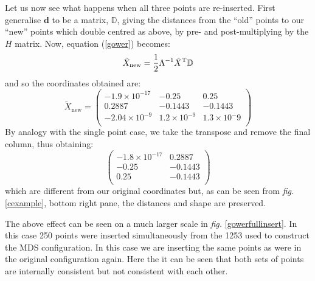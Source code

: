 \documentclass[a4paper,10pt]{article}
\newcommand{\fig}[1]{\emph{fig.} \ref{#1}}
\newcommand{\tr}[1]{#1^{\text{T}}}
\newcommand{\cross}{\times}
\begin{document}
Let us now see what happens when all three points are re-inserted. First generalise $\mathbf{d}$ to be a matrix, $\mathbb{D}$, giving the distances from the ``old'' points to our ``new'' points which double centred as above, by pre- and post-multiplying by the $H$ matrix. Now, equation (\ref{gower}) becomes:
\begin{equation*}
\tilde{X}_{\text{new}} = \frac{1}{2} \Lambda^{-1} \tr{\tilde{X}} \mathbb{D}\\
\end{equation*}
and so the coordinates obtained are:
\begin{equation*}
\tilde{X}_\text{new}=\begin{pmatrix}
-1.9\cross 10^{-17} & -0.25 & 0.25\\
 0.2887 & -0.1443 & -0.1443\\
-2.04\cross 10^{-9} &  1.2\cross 10^{-9} & 1.3\cross 10^-{9}\\
\end{pmatrix}
\end{equation*}
By analogy with the single point case, we take the transpose and remove the final column, thus obtaining:
\begin{equation*}
\begin{pmatrix}
-1.8\cross 10^{-17} &  0.2887\\
-0.25 & -0.1443\\
 0.25 & -0.1443\\
\end{pmatrix}
\end{equation*}
which are different from our original coordinates but, as can be seen from \fig{cexample}, bottom right pane, the distances and shape are preserved.

The above effect can be seen on a much larger scale in \fig{gowerfullinsert}. In this case 250 points were inserted simultaneously from the 1253 used to construct the MDS configuration. In this case we are inserting the same points as were in the original configuration again. Here the it can be seen that both sets of points are internally consistent but not consistent with each other. 
\end{document}
